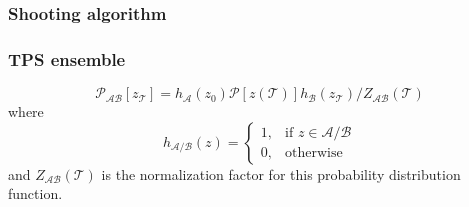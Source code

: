 \documentclass{beamer}
\begin{document}
\begin{frame}
\frametitle{}
\end{frame}
\begin{frame}
\frametitle{Shooting algorithm}

\end{frame}
\begin{frame}
\frametitle{TPS ensemble}
\begin{equation}
\mathcal{P}_{\mathcal{AB}}[z_{\mathcal{T}}] = h_{\mathcal{A}}(z_0)\mathcal{P}[z(\mathcal{T})]
h_{\mathcal{B}}(z_{\mathcal{T}})/Z_{\mathcal{AB}}(\mathcal{T})\label{eqn:tpsensem}
\end{equation}
where 
\[
    h_{\mathcal{A}/\mathcal{B}}(z)= 
\begin{cases}
    1, & \text{if } z\in \mathcal{A}/\mathcal{B}\\
    0,              & \text{otherwise}
\end{cases}
\]
and $Z_{\mathcal{AB}}(\mathcal{T})$ is the normalization factor for this 
probability distribution function.
\end{frame}
\end{document}
